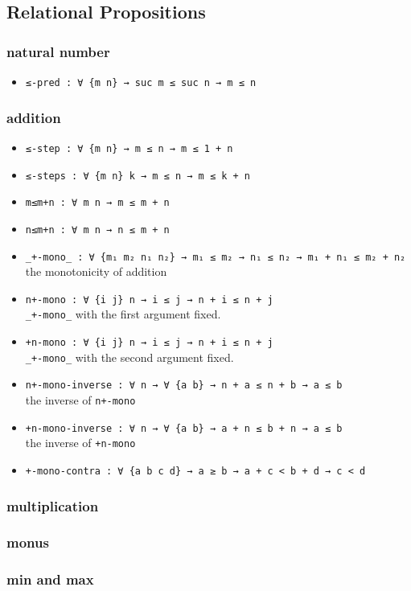 \documentclass[../thesis.tex]{subfiles}
\begin{document}
\subsection{Relational Propositions}

\subsubsection{natural number}

\begin{itemize}
    \item {\lstinline|≤-pred : ∀ {m n} → suc m ≤ suc n → m ≤ n|}
\end{itemize}

\subsubsection{addition}

\begin{itemize}
    \item {\lstinline|≤-step : ∀ {m n} → m ≤ n → m ≤ 1 + n|}
    \item {\lstinline|≤-steps : ∀ {m n} k → m ≤ n → m ≤ k + n|}
    \item {\lstinline|m≤m+n : ∀ m n → m ≤ m + n|}
    \item {\lstinline|n≤m+n : ∀ m n → n ≤ m + n|}
    \item {\lstinline|_+-mono_ : ∀ {m₁ m₂ n₁ n₂} → m₁ ≤ m₂ → n₁ ≤ n₂ → m₁ + n₁ ≤ m₂ + n₂|}
        \\ the monotonicity of addition
    \item {\lstinline|n+-mono : ∀ {i j} n → i ≤ j → n + i ≤ n + j|}
        \\ {\lstinline|_+-mono_|} with the first argument fixed.
    \item {\lstinline|+n-mono : ∀ {i j} n → i ≤ j → n + i ≤ n + j|}
        \\ {\lstinline|_+-mono_|} with the second argument fixed.
    \item {\lstinline|n+-mono-inverse : ∀ n → ∀ {a b} → n + a ≤ n + b → a ≤ b|}
        \\ the inverse of {\lstinline|n+-mono|}
    \item {\lstinline|+n-mono-inverse : ∀ n → ∀ {a b} → a + n ≤ b + n → a ≤ b|}
        \\ the inverse of {\lstinline|+n-mono|}
    \item {\lstinline|+-mono-contra : ∀ {a b c d} → a ≥ b → a + c < b + d → c < d|}
\end{itemize}
\subsubsection{multiplication}
\subsubsection{monus}
\subsubsection{min and max}
\end{document}
